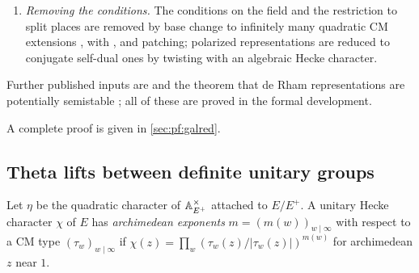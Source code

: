 \begin{proofoutline}
\begin{enumerate}[label=(\roman*),nosep]
  \cite{Labesse2011,ClozelHarrisLabesse2011} (proved in the development from the Jacquet--Shalika bound
  and multiplicity one), transfers the representations to $\GL_a$.
\item \emph{Removing the conditions.} The conditions on the field and the restriction to split places
  are removed by base change to infinitely many quadratic CM extensions \cite{ArthurClozel1989}, with
  \cite{JacquetShalika1981,GelfandKazhdan1975}, and patching; polarized representations are reduced to
  conjugate self-dual ones by twisting with an algebraic Hecke character.
\end{enumerate}
Further published inputs are \cite{BernsteinZelevinsky1977,Zelevinsky1980,Tadic1986} and the theorem
that de Rham representations are potentially semistable \cite{Berger2002}; all of these are proved in
the formal development.

A complete proof is given in \cref{sec:pf:galred}.
\end{proofoutline}

\subsection{Theta lifts between definite unitary groups}\label{sec:galois:theta}

Let $\eta$ be the quadratic character of $\mathbb{A}_{E^+}^\times$ attached to $E/E^+$. A unitary Hecke
character $\chi$ of $E$ has \emph{archimedean exponents} $m=(m(w))_{w\mid\infty}$ with respect to a CM
type $(\tau_w)_{w\mid\infty}$ if $\chi(z)=\prod_w(\tau_w(z)/|\tau_w(z)|)^{m(w)}$ for archimedean $z$ near
$1$.

